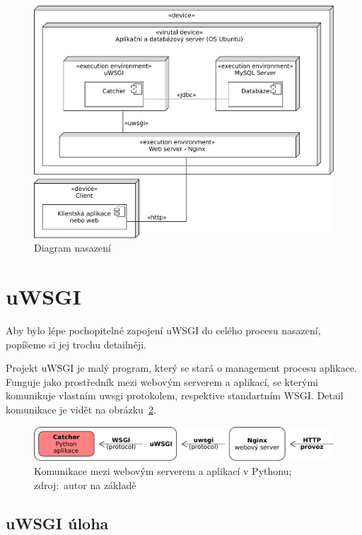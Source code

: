 \begin{figure}[ht!]
\centering
\includegraphics[width=130mm]{./images/diagram-nasazeni.pdf}
\caption{Diagram nasazení\label{overflow}}
\end{figure}

\section{uWSGI}

Aby bylo lépe pochopitelné zapojení uWSGI do celého procesu nasazení, popíšeme si jej trochu detailněji.

Projekt uWSGI je malý program, který se stará o management procesu aplikace.
Funguje jako prostředník mezi webovým serverem a aplikací,
se kterými komunikuje vlastním uwsgi protokolem, respektive standartním WSGI.
Detail komunikace je vidět na obrázku~\ref{fig:uwsgi}.

\begin{figure}[ht!]
\centering
\includegraphics[width=135mm]{./images/uwsgi.pdf}
\caption{Komunikace mezi webovým serverem a aplikací v Pythonu; zdroj:~autor na základě~\cite{uwsgi}\label{overflow}}
\label{fig:uwsgi}
\end{figure}

\subsection*{uWSGI úloha}

